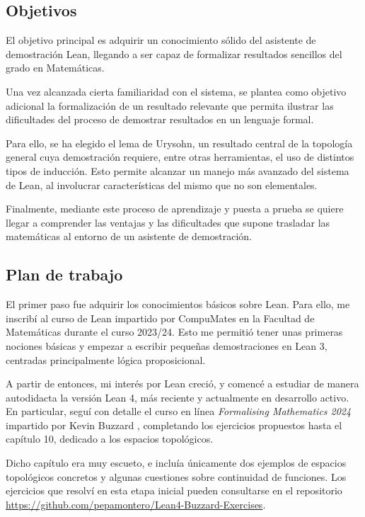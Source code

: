 \subsection{Objetivos}

El objetivo principal es adquirir un conocimiento sólido del asistente de demostración Lean, llegando a ser capaz de formalizar resultados sencillos del grado en Matemáticas.

Una vez alcanzada cierta familiaridad con el sistema, se plantea como objetivo adicional la formalización de un resultado relevante que permita ilustrar las dificultades del proceso de demostrar resultados en un lenguaje formal.

Para ello, se ha elegido el lema de Urysohn, un resultado central de la topología general cuya demostración requiere, entre otras herramientas, el uso de distintos tipos de inducción. Esto permite alcanzar un manejo más avanzado del sistema de Lean, al involucrar características del mismo que no son elementales.

Finalmente, mediante este proceso de aprendizaje y puesta a prueba se quiere llegar a comprender las ventajas y las dificultades que supone trasladar las matemáticas al entorno de un asistente de demostración.

\subsection{Plan de trabajo}

El primer paso fue adquirir los conocimientos básicos sobre Lean. Para ello, me inscribí al curso de Lean impartido por CompuMates en la Facultad de Matemáticas durante el curso 2023/24. Esto me permitió tener unas primeras nociones básicas y empezar a escribir pequeñas demostraciones en Lean 3, centradas principalmente lógica proposicional.

A partir de entonces, mi interés por Lean creció, y comencé a estudiar de manera autodidacta la versión Lean 4, más reciente y actualmente en desarrollo activo. En particular, seguí con detalle el curso en línea \textit{Formalising Mathematics 2024} impartido por Kevin Buzzard \cite{buzzard2024formalising}, completando los ejercicios propuestos hasta el capítulo 10, dedicado a los espacios topológicos.

Dicho capítulo era muy escueto, e incluía únicamente dos ejemplos de espacios topológicos concretos y algunas cuestiones sobre continuidad de funciones. Los ejercicios que resolví en esta etapa inicial pueden consultarse en el repositorio \url{https://github.com/pepamontero/Lean4-Buzzard-Exercises}.

